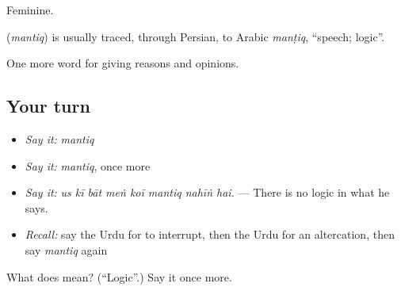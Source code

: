 Feminine.

\begin{cousinweb}
\textbf{} (\emph{mantiq}) is usually traced, through Persian, to Arabic \emph{manṭiq}, \textquotedblleft{}speech; logic\textquotedblright{}.
\end{cousinweb}

\begin{grammarlens}[title={What you've built}]
One more word for giving reasons and opinions.
\end{grammarlens}

\subsection*{Your turn}
\begin{itemize}
\raggedright
  \item \emph{Say it:} \emph{mantiq}
  \item \emph{Say it:} \emph{mantiq}, once more
  \item \emph{Say it:} \emph{us kī bāt meṅ koī mantiq nahīṅ hai.} — There is no logic in what he says.
  \item \emph{Recall:} say the Urdu for to interrupt, then the Urdu for an altercation, then say \emph{mantiq} again
\end{itemize}

\begin{tcolorbox}[breakable,colback=teal!4,colframe=teal!35!black,title={Before you move on}]
What does  mean? (\textquotedblleft{}Logic\textquotedblright{}.) Say it once more.
\end{tcolorbox}
